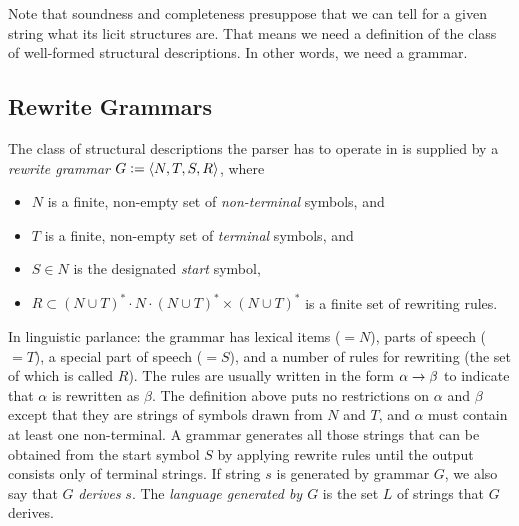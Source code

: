 Note that soundness and completeness presuppose that we can tell for a given string what its licit structures are.
That means we need a definition of the class of well-formed structural descriptions.
In other words, we need a grammar.

\subsection{Rewrite Grammars}
\label{sub:BigPicture_Grammars}
The class of structural descriptions the parser has to operate in is supplied by a \emph{rewrite grammar} $G \mathrel{\mathop:}= \left \langle N, T, S, R \right \rangle $, where
%
\begin{itemize}
    \item $N$ is a finite, non-empty set of \emph{non-terminal} symbols, and
    \item $T$ is a finite, non-empty set of \emph{terminal} symbols, and
    \item $S \in N$ is the designated \emph{start} symbol,
    \item $R \subset (N \cup T)^* \cdot N \cdot (N \cup T)^* \times (N \cup T)^*$ is a finite set of rewriting rules.
\end{itemize}
%
In linguistic parlance: the grammar has lexical items ($= N$), parts of speech ($=T$), a special part of speech ($=S$), and a number of rules for rewriting (the set of which is called $R$).
The rules are usually written in the form $\alpha \rightarrow \beta$ to indicate that $\alpha$ is rewritten as $\beta$.
The definition above puts no restrictions on $\alpha$ and $\beta$ except that they are strings of symbols drawn from $N$ and $T$, and $\alpha$ must contain at least one non-terminal.
A grammar generates all those strings that can be obtained from the start symbol $S$ by applying rewrite rules until the output consists only of terminal strings.
If string $s$ is generated by grammar $G$, we also say that $G$ \emph{derives} $s$.
The \emph{language generated by $G$} is the set $L$ of strings that $G$ derives.
%
